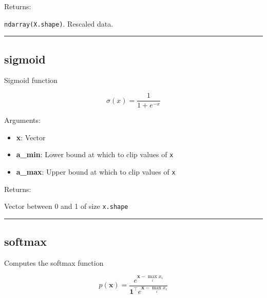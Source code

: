 Returns:

\texttt{ndarray(X.shape)}. Rescaled data.

\begin{center}\rule{0.5\linewidth}{\linethickness}\end{center}

\subsection{sigmoid}\label{sigmoid}

\begin{Shaded}
\begin{Highlighting}[]
\OperatorTok{=-}\OperatorTok{=}\NormalTok{)}
\end{Highlighting}
\end{Shaded}

Sigmoid function

\[
\sigma(x) = \frac{1}{1 + e^{-x}}
\]

Arguments:

\begin{itemize}
\tightlist
\item
  \textbf{x}: Vector
\item
  \textbf{a\_min}: Lower bound at which to clip values of \texttt{x}
\item
  \textbf{a\_max}: Upper bound at which to clip values of \texttt{x}
\end{itemize}

Returns:

Vector between 0 and 1 of size \texttt{x.shape}

\begin{center}\rule{0.5\linewidth}{\linethickness}\end{center}

\subsection{softmax}\label{softmax}

\begin{Shaded}
\begin{Highlighting}[]
\end{Highlighting}
\end{Shaded}

Computes the softmax function

\[
p(\mathbf{x}) = \frac{e^{\mathbf{x} - \max_i x_i}}{\mathbf{1}^\top e^{\mathbf{x} - \max_i x_i}}
\]

